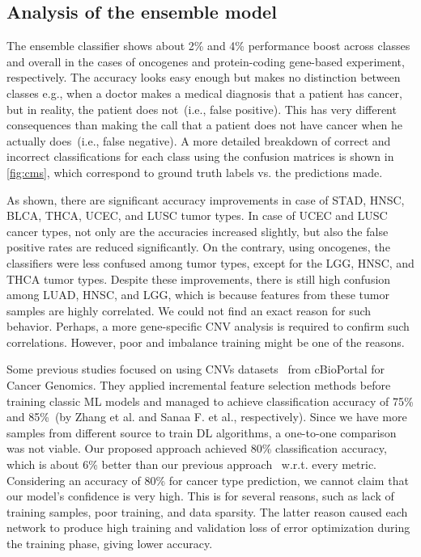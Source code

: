\subsection{Analysis of the ensemble model}
The ensemble classifier shows about 2\% and 4\% performance boost across classes and overall in the cases of oncogenes and protein-coding gene-based experiment, respectively. The accuracy looks easy enough but makes no distinction between classes e.g., when a doctor makes a medical diagnosis that a patient has cancer, but in reality, the patient does not~(i.e., false positive). This has very different consequences than making the call that a patient does not have cancer when he actually does~(i.e., false negative). A more detailed breakdown of correct and incorrect classifications for each class using the confusion matrices is shown in \cref{fig:cms}, which correspond to ground truth labels vs. the predictions made.

\hspace*{3.5mm} As shown, there are significant accuracy improvements in case of STAD, HNSC, BLCA, THCA, UCEC, and LUSC tumor types. In case of UCEC and LUSC cancer types, not only are the accuracies increased slightly, but also the false positive rates are reduced significantly. On the contrary, using oncogenes, the classifiers were less confused among tumor types, except for the LGG, HNSC, and THCA tumor types. Despite these improvements, there is still high confusion among LUAD, HNSC, and LGG, which is because features from these tumor samples are highly correlated. We could not find an exact reason for such behavior. Perhaps, a more gene-specific CNV analysis is required to confirm such correlations. However, poor and imbalance training might be one of the reasons. 

\hspace*{3.5mm} Some previous studies focused on using CNVs datasets~\cite{zhang2016classification,elsadek2018supervised} from cBioPortal for Cancer Genomics. They applied incremental feature selection methods before training classic ML models and managed to achieve classification accuracy of 75\% and 85\%~(by Zhang et al. and Sanaa F. et al., respectively). Since we have more samples from different source to train DL algorithms, a one-to-one comparison was not viable. Our proposed approach achieved 80\% classification accuracy, which is about 6\% better than our previous approach~\cite{karim2018a2ic} w.r.t. every metric. Considering an accuracy of 80\% for cancer type prediction, we cannot claim that our model’s confidence is very high. This is for several reasons, such as lack of training samples, poor training, and data sparsity. The latter reason caused each network to produce high training and validation loss of error optimization during the training phase, giving lower accuracy. 

